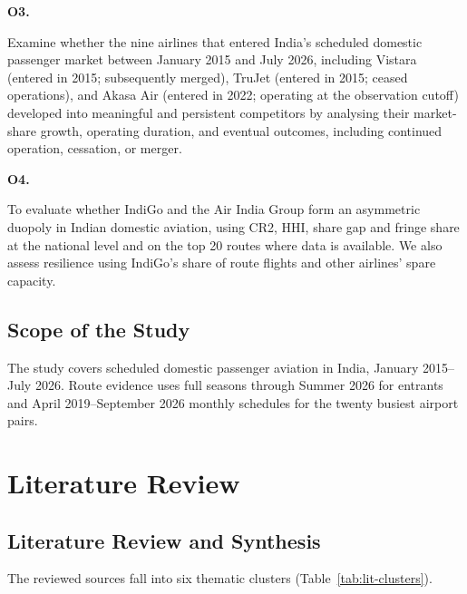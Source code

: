 \documentclass[12pt,a4paper]{article}
\newenvironment{authorcontribution}[1]{\par\begingroup\color{#1}}{\par\endgroup}
\begin{document}
\begin{authorcontribution}{authorSweta}
\begin{minipage}{\linewidth}
\hypertarget{objective:3}{\textbf{O3.}} Examine whether the nine airlines that entered India’s scheduled domestic passenger market between January 2015 and July 2026, including Vistara (entered in 2015; subsequently merged), TruJet (entered in 2015; ceased operations), and Akasa Air (entered in 2022; operating at the observation cutoff) developed into meaningful and persistent competitors by analysing their market-share growth, operating duration, and eventual outcomes, including continued operation, cessation, or merger.
\par\end{minipage}
\end{authorcontribution}

\begin{authorcontribution}{authorGoutham}
\begin{minipage}{\linewidth}
\hypertarget{objective:4}{\textbf{O4.}} To evaluate whether IndiGo and the Air India Group form an asymmetric duopoly in Indian domestic aviation, using CR2, HHI, share gap and fringe share at the national level and on the top 20 routes where data is available. We also assess resilience using IndiGo's share of route flights and other airlines' spare capacity.
\par\end{minipage}
\end{authorcontribution}

\subsection{Scope of the Study}
The study covers scheduled domestic passenger aviation in India, January 2015--July 2026. Route evidence uses full seasons through Summer 2026 for entrants and April 2019--September 2026 monthly schedules for the twenty busiest airport pairs.

\section{Literature Review}
\subsection{Literature Review and Synthesis}
The reviewed sources fall into six thematic clusters (Table~\ref{tab:lit-clusters}).
\end{document}
